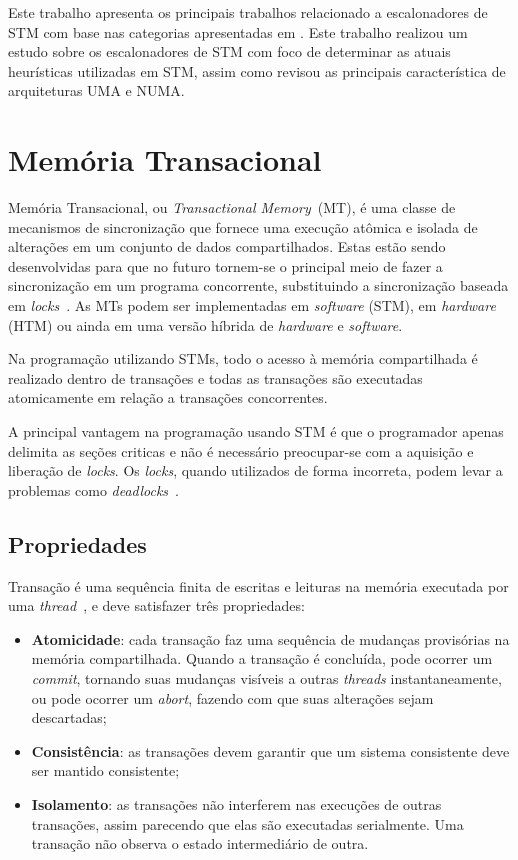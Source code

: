 \documentclass[ti]{texufpel}
\begin{document}
Este trabalho apresenta os principais trabalhos relacionado a escalonadores de STM com base nas categorias apresentadas em \cite{sanzo17}. Este trabalho realizou um estudo sobre os escalonadores de STM com foco de determinar as atuais heurísticas utilizadas em STM, assim como revisou as principais característica de arquiteturas UMA e NUMA.

\chapter{Memória Transacional}

Memória Transacional, ou \emph{Transactional Memory}~(MT), é uma classe de mecanismos de sincronização que fornece uma execução atômica e isolada de alterações em um conjunto de dados compartilhados. Estas estão sendo desenvolvidas para que no futuro tornem-se o principal meio de fazer a sincronização em um programa concorrente, substituindo a sincronização baseada em \emph{locks}~\cite{herlihy06}. As MTs podem ser implementadas em \emph{software} (STM), em \emph{hardware} (HTM) ou ainda em uma versão híbrida de \emph{hardware} e \emph{software}.

Na programação utilizando STMs, todo o acesso à memória compartilhada é realizado dentro de transações e todas as transações são executadas atomicamente em relação a transações concorrentes.

A principal vantagem na programação usando STM é que o programador apenas delimita as seções criticas e não é necessário preocupar-se com a aquisição e liberação de \emph{locks}. Os \emph{locks}, quando utilizados de forma incorreta, podem levar a problemas como \emph{deadlocks}~\cite{bandeira10}.

\section{Propriedades}

Transação é uma sequência finita de escritas e leituras na memória executada por uma \emph{thread}~\cite{herlihy93}, e deve satisfazer três propriedades:

\begin{itemize}
 \item \textbf{Atomicidade}: cada transação faz uma sequência de mudanças provisórias na memória compartilhada. Quando a transação é concluída, pode ocorrer um \emph{commit}, tornando suas mudanças visíveis a outras \emph{threads} instantaneamente, ou pode ocorrer um \emph{abort}, fazendo com que suas alterações sejam descartadas;

 \item \textbf{Consistência}: as transações devem garantir que um sistema consistente deve ser mantido consistente;

 \item \textbf{Isolamento}: as transações não interferem nas execuções de outras transações, assim parecendo que elas são executadas serialmente. Uma transação não observa o estado intermediário de outra.
\end{itemize}
\end{document}
